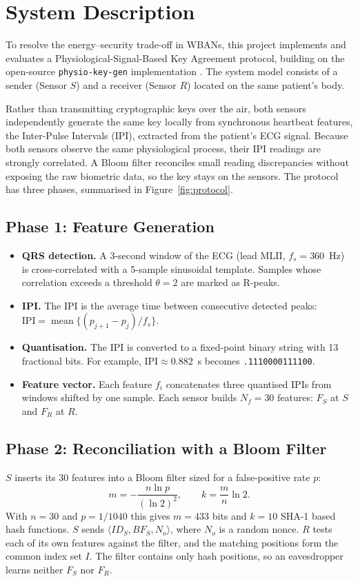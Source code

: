 \section{System Description}
To resolve the energy--security trade-off in WBANs, this project implements and evaluates a Physiological-Signal-Based Key Agreement protocol, building on the open-source \texttt{physio-key-gen} implementation \cite{physiokeygen}. The system model consists of a sender (Sensor $S$) and a receiver (Sensor $R$) located on the same patient's body.

Rather than transmitting cryptographic keys over the air, both sensors independently generate the same key locally from synchronous heartbeat features, the Inter-Pulse Intervals (IPI), extracted from the patient's ECG signal. Because both sensors observe the same physiological process, their IPI readings are strongly correlated. A Bloom filter \cite{bloom1970space} reconciles small reading discrepancies without exposing the raw biometric data, so the key stays on the sensors. The protocol has three phases, summarised in Figure~\ref{fig:protocol}.

\subsection{Phase 1: Feature Generation}
\begin{itemize}
  \item \textbf{QRS detection.} A 3-second window of the ECG (lead MLII, $f_s = 360$~Hz) is cross-correlated with a 5-sample sinusoidal template. Samples whose correlation exceeds a threshold $\theta = 2$ are marked as R-peaks.
  \item \textbf{IPI.} The IPI is the average time between consecutive detected peaks: $\mathrm{IPI} = \operatorname{mean}\{(p_{j+1}-p_j)/f_s\}$.
  \item \textbf{Quantisation.} The IPI is converted to a fixed-point binary string with 13 fractional bits. For example, $\mathrm{IPI}\approx 0.882$~s becomes \texttt{.1110000111100}.
  \item \textbf{Feature vector.} Each feature $f_i$ concatenates three quantised IPIs from windows shifted by one sample. Each sensor builds $N_f = 30$ features: $F_S$ at $S$ and $F_R$ at $R$.
\end{itemize}

\subsection{Phase 2: Reconciliation with a Bloom Filter}
$S$ inserts its 30 features into a Bloom filter sized for a false-positive rate $p$:
\begin{equation}
  m = -\frac{n \ln p}{(\ln 2)^2}, \qquad k = \frac{m}{n}\ln 2 .
  \label{eq:bloom}
\end{equation}
With $n = 30$ and $p = 1/1040$ this gives $m = 433$ bits and $k = 10$ SHA-1 based hash functions. $S$ sends $\langle ID_S, \mathit{BF}_S, N_o\rangle$, where $N_o$ is a random nonce. $R$ tests each of its own features against the filter, and the matching positions form the common index set $I$. The filter contains only hash positions, so an eavesdropper learns neither $F_S$ nor $F_R$.

